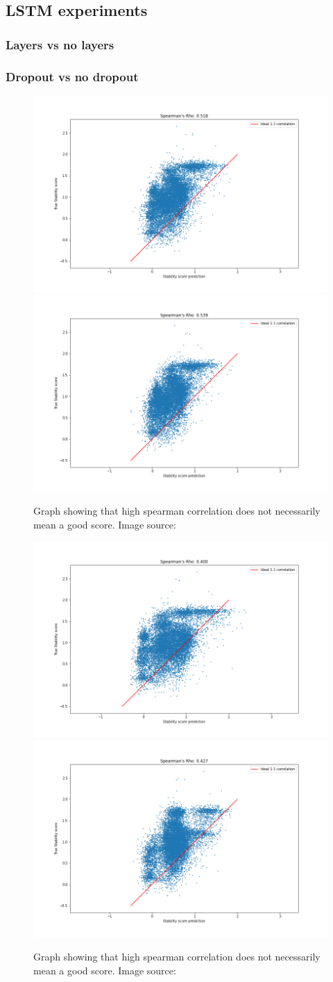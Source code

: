 \subsection{LSTM experiments}

\subsubsection{Layers vs no layers}


\subsubsection{Dropout vs no dropout}



\begin{figure}[!ht]
  \centering
  \includegraphics[width=0.4\linewidth]{latex/imgs/spearman_2_layer_05_drop_final.png}
  \includegraphics[width=0.4\linewidth]{latex/imgs/spearman_2_layer_05_drop_minloss.png}
  \caption{Graph showing that high spearman correlation does not necessarily mean a good score. Image source:\cite{spearman}}
\end{figure}
\begin{figure}[!ht]
  \centering
  \includegraphics[width=0.4\linewidth]{latex/imgs/spearman_2_layer_no_drop_final.png}
  \includegraphics[width=0.4\linewidth]{latex/imgs/spearman_2_layer_no_drop_minloss.png}
  \caption{Graph showing that high spearman correlation does not necessarily mean a good score. Image source:\cite{spearman}}
\end{figure}
